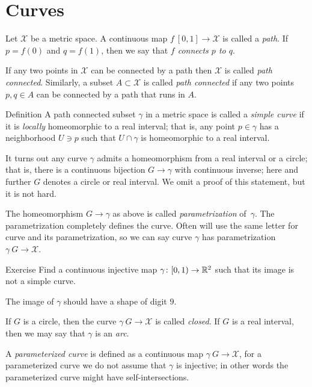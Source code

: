 \chapter{Curves}

Let $\mathcal{X}$ be a metric space.
A continuous map $f\:[0,1]\to\mathcal{X}$ is called a \emph{path}.
If $p=f(0)$ and $q=f(1)$, then we say that \emph{$f$ connects $p$ to $q$}.

If any two points in $\mathcal{X}$ can be connected by a path then $\mathcal{X}$ is called \emph{path connected}.
Similarly, a subset $A\subset \mathcal{X}$ is called \emph{path connected} if any two points $p,q\in A$ can be connected by a path that runs in $A$.

\begin{thm}{Definition} 
A path connected subset $\gamma$ in a metric space is called a \emph{simple curve} if it is \emph{locally} homeomorphic to a real interval; that is, any point $p\in\gamma$ has a neighborhood $U\ni p$ such that 
$U\cap \gamma$ is homeomorphic to a real interval.
\end{thm}

It turns out any curve $\gamma$ admits a homeomorphism from a real interval or a circle;
that is, there is a continuous bijection $G\to \gamma$ with continuous inverse;
here and further $G$ denotes a circle or real interval.
We omit a proof of this statement, but it is not hard.

The homeomorphism $G\to \gamma$ as above is called \emph{parametrization} of~$\gamma$.
The parametrization completely defines the curve.
Often will use the same letter for curve and its parametrization, so we can say curve $\gamma$ has parametrization $\gamma\:G\to \mathcal{X}$.

\begin{thm}{Exercise}
Find a continuous injective map $\gamma\colon[0,1)\to\mathbb{R}^2$ such that its image is not a simple curve.
\end{thm}

 The image of $\gamma$ should have a shape of digit $9$.


If $G$ is a circle, then the curve $\gamma\:G\to \mathcal{X}$ is called \emph{closed}.
If $G$ is a real interval, then  we may say that $\gamma$ is an \emph{arc}.

A \emph{parameterized curve} is defined as a continuous map $\gamma\: G\to \mathcal{X}$, for a parameterized curve we do not assume that $\gamma$ is injective; in other words the parameterized curve might have self-intersections.

